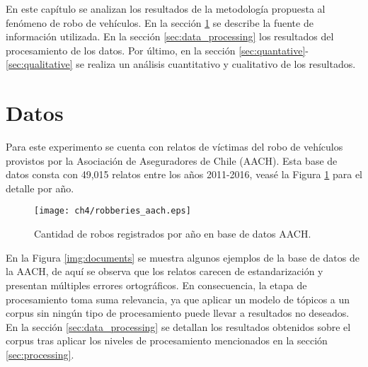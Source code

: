 En este capítulo se analizan los resultados de la metodología propuesta al fenómeno de robo de vehículos. En la sección \ref{sec:data} se describe la fuente de información utilizada. En la sección \ref{sec:data_processing} los resultados del procesamiento de los datos. Por último, en la sección \ref{sec:quantative}-\ref{sec:qualitative} se realiza un análisis cuantitativo y cualitativo de los resultados.

\section{Datos}
\label{sec:data}

Para este experimento se cuenta con relatos de víctimas del robo de vehículos provistos por la Asociación de Aseguradores de Chile (AACH). Esta base de datos consta con 49,015 relatos entre los años 2011-2016, veasé la Figura \ref{img:robberies_aach} para el detalle por año.

\begin{figure}
\texttt{[image: ch4/robberies\_aach.eps]}
\caption{Cantidad de robos registrados por año en base de datos AACH.}
\label{img:robberies_aach}
\end{figure}

En la Figura \ref{img:documents} se muestra algunos ejemplos de la base de datos de la AACH, de aquí se observa que los relatos carecen de estandarización y presentan múltiples errores ortográficos. En consecuencia, la etapa de procesamiento toma suma relevancia, ya que aplicar un modelo de tópicos a un corpus sin ningún tipo de procesamiento puede llevar a resultados no deseados. En la sección \ref{sec:data_processing} se detallan los resultados obtenidos sobre el corpus tras aplicar los niveles de procesamiento mencionados en la sección \ref{sec:processing}.

